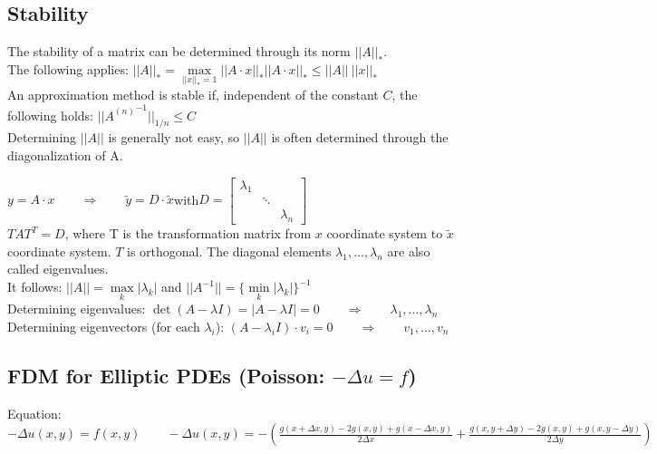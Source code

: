\subsection{Stability}
The stability of a matrix can be determined through its norm $||A||_*$.\\

The following applies: $||A||_*=\max\limits_{||x||_*=1}||A\cdot x||_*$\qquad$||A\cdot x||_*\leq||A||~||x||_*$\\

An approximation method is stable if, independent of the constant $C$, the following holds:
$\boxed{||{A^{(n)}}^{-1}||_{1/n}\leq C}$\\

Determining $||A||$ is generally not easy, so $||A||$ is often determined through the diagonalization of A.

$y=A\cdot x\qquad\Rightarrow\qquad\tilde{y}=D\cdot\tilde{x}$\qquad with\qquad $D=\begin{bmatrix}\lambda_1&&\\&\ddots&\\&&\lambda_n\end{bmatrix}$\\

$TAT^T=D$, where T is the transformation matrix from $x$ coordinate system to $\tilde{x}$ coordinate system. $T$ is orthogonal.
The diagonal elements $\lambda_1,\ldots,\lambda_n$ are also called eigenvalues.\\

It follows: $\boxed{||A||=\max\limits_{k}|\lambda_k|}$ and $\boxed{||A^{-1}||=\{\min\limits_{k}|\lambda_k|\}^{-1}}$\\

Determining eigenvalues: $\boxed{\det(A-\lambda I)=|A-\lambda I|=0}\qquad \Rightarrow \qquad \lambda_1,\ldots,\lambda_n$\\
Determining eigenvectors (for each $\lambda_i$): $(A-\lambda_i I) \cdot v_i=0\qquad \Rightarrow \qquad v_1,\ldots,v_n$\\

\subsection{FDM for Elliptic PDEs (Poisson: $-\Delta u = f$)}

Equation:    $-\Delta u(x,y)= f(x,y) \qquad
-\Delta u(x,y) = -\left(\frac{g(x+\Delta x,y ) -2 g(x,y)+ g(x-\Delta x,y)}{2\Delta x} +
\frac{g(x,y+\Delta y) -2 g(x,y)+ g(x,y-\Delta y)}{2\Delta y}\right)$\\


